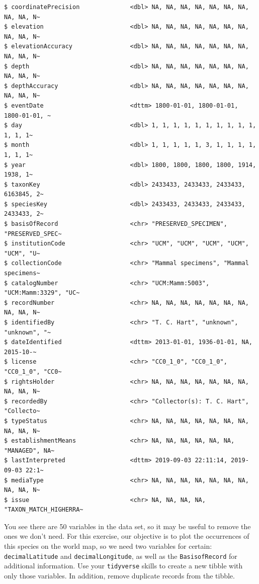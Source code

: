 \documentclass[
  letterpaper,
  DIV=11,
  numbers=noendperiod]{scrreprt}
\begin{document}
\begin{verbatim}
$ coordinatePrecision              <dbl> NA, NA, NA, NA, NA, NA, NA, NA, NA, N~
$ elevation                        <dbl> NA, NA, NA, NA, NA, NA, NA, NA, NA, N~
$ elevationAccuracy                <dbl> NA, NA, NA, NA, NA, NA, NA, NA, NA, N~
$ depth                            <dbl> NA, NA, NA, NA, NA, NA, NA, NA, NA, N~
$ depthAccuracy                    <dbl> NA, NA, NA, NA, NA, NA, NA, NA, NA, N~
$ eventDate                        <dttm> 1800-01-01, 1800-01-01, 1800-01-01, ~
$ day                              <dbl> 1, 1, 1, 1, 1, 1, 1, 1, 1, 1, 1, 1, 1~
$ month                            <dbl> 1, 1, 1, 1, 1, 3, 1, 1, 1, 1, 1, 1, 1~
$ year                             <dbl> 1800, 1800, 1800, 1800, 1914, 1938, 1~
$ taxonKey                         <dbl> 2433433, 2433433, 2433433, 6163845, 2~
$ speciesKey                       <dbl> 2433433, 2433433, 2433433, 2433433, 2~
$ basisOfRecord                    <chr> "PRESERVED_SPECIMEN", "PRESERVED_SPEC~
$ institutionCode                  <chr> "UCM", "UCM", "UCM", "UCM", "UCM", "U~
$ collectionCode                   <chr> "Mammal specimens", "Mammal specimens~
$ catalogNumber                    <chr> "UCM:Mamm:5003", "UCM:Mamm:3329", "UC~
$ recordNumber                     <chr> NA, NA, NA, NA, NA, NA, NA, NA, NA, N~
$ identifiedBy                     <chr> "T. C. Hart", "unknown", "unknown", "~
$ dateIdentified                   <dttm> 2013-01-01, 1936-01-01, NA, 2015-10-~
$ license                          <chr> "CC0_1_0", "CC0_1_0", "CC0_1_0", "CC0~
$ rightsHolder                     <chr> NA, NA, NA, NA, NA, NA, NA, NA, NA, N~
$ recordedBy                       <chr> "Collector(s): T. C. Hart", "Collecto~
$ typeStatus                       <chr> NA, NA, NA, NA, NA, NA, NA, NA, NA, N~
$ establishmentMeans               <chr> NA, NA, NA, NA, NA, NA, "MANAGED", NA~
$ lastInterpreted                  <dttm> 2019-09-03 22:11:14, 2019-09-03 22:1~
$ mediaType                        <chr> NA, NA, NA, NA, NA, NA, NA, NA, NA, N~
$ issue                            <chr> NA, NA, NA, NA, "TAXON_MATCH_HIGHERRA~
\end{verbatim}

You see there are 50 variables in the data set, so it may be useful to
remove the ones we don't need. For this exercise, our objective is to
plot the occurrences of this species on the world map, so we need two
variables for certain: \texttt{decimalLatitude} and
\texttt{decimalLongitude}, as well as the \texttt{BasisofRecord} for
additional information. Use your \texttt{tidyverse} skills to create a
new tibble with only those variables. In addition, remove duplicate
records from the tibble.
\end{document}
